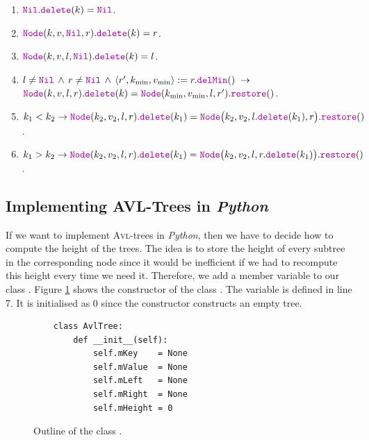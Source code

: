 \begin{enumerate}
\item $\mytt{Nil}.\mytt{delete}(k) = \mytt{Nil}$.
\item $\mytt{Node}(k,v,\mytt{Nil},r).\mytt{delete}(k) = r$.
\item $\mytt{Node}(k,v,l,\mytt{Nil}).\mytt{delete}(k) = l$.
\item $l \not= \mytt{Nil} \,\wedge\, r \not= \mytt{Nil} \,\wedge\, 
       \langle r',k_{\textrm{min}}, v_{\textrm{min}} \rangle := r.\mytt{delMin}()  \;\rightarrow$ \\[0.2cm]
      \hspace*{1.3cm}
      $\mytt{Node}(k,v,l,r).\mytt{delete}(k) = \mytt{Node}(k_{\textrm{min}},v_{\textrm{min}},l,r').\mytt{restore}()$.
\item $k_1 < k_2 \rightarrow \mytt{Node}(k_2,v_2,l,r).\mytt{delete}(k_1) = 
       \mytt{Node}\bigl(k_2,v_2,l.\mytt{delete}(k_1),r\bigr).\mytt{restore}()$.
\item $k_1 > k_2 \rightarrow \mytt{Node}(k_2,v_2,l,r).\mytt{delete}(k_1) = 
         \mytt{Node}\bigl(k_2,v_2,l,r.\mytt{delete}(k_1)\bigr).\mytt{restore}()$.
\end{enumerate}


\subsection{Implementing AVL-Trees in \textsl{Python}}
If we want to implement \textsc{Avl}-trees in \textsl{Python}, then we have to decide how to compute the height
of the trees.  The idea is to store the height of every subtree in the corresponding node since it
would be inefficient if we had to recompute this height every time we need it.  Therefore, we add a
member variable  to our class .
Figure \ref{fig:avl-tree.ipython:init} shows the constructor of the class .  The variable
 is defined in line 7.  It is initialised as $0$ since the constructor 
constructs an empty tree.  

\begin{figure}[!ht]
  \centering
\begin{verbatim}
    class AvlTree:
        def __init__(self):
            self.mKey    = None
            self.mValue  = None
            self.mLeft   = None
            self.mRight  = None
            self.mHeight = 0 
\end{verbatim}
\vspace*{-0.3cm}
  \caption{Outline of the class .}
  \label{fig:avl-tree.ipython:init}
\end{figure}

